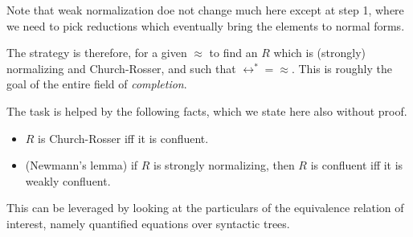 Note that weak normalization doe not change much here except at step 1, where we need to pick reductions which eventually bring the elements to normal forms.

The strategy is therefore, for a given $\approx$ to find an $R$ which is (strongly) normalizing and Church-Rosser, and such that $\leftrightarrow^* = \approx$. This is roughly the goal of the entire field of \emph{completion}.

The task is helped by the following facts, which we state here also without proof.

\begin{theorem}
  \begin{itemize}
  \item $R$ is Church-Rosser iff it is confluent.
  \item (Newmann's lemma) if $R$ is strongly normalizing, then $R$ is confluent iff it is weakly confluent.
  \end{itemize}
\end{theorem}

This can be leveraged by looking at the particulars of the equivalence relation of interest, namely quantified equations over syntactic trees.


